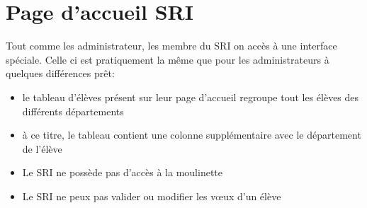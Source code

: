 \section{Page d'accueil SRI}

Tout comme les administrateur, les membre du SRI on accès à une interface spéciale. Celle ci est pratiquement la même que pour les administrateurs à quelques différences prêt:
\begin{itemize}
 	\item le tableau d'élèves présent sur leur page d'accueil regroupe tout les élèves des différents départements
 	\item à ce titre, le tableau contient une colonne supplémentaire avec le département de l'élève
 	\item Le SRI ne possède pas d'accès à la moulinette
 	\item Le SRI ne peux pas valider ou modifier les vœux d'un élève
 \end{itemize}